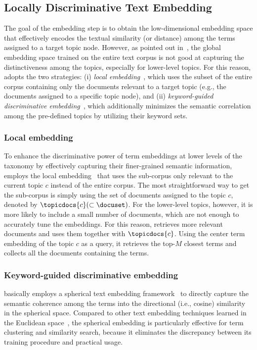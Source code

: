 \subsection{Locally Discriminative Text Embedding}
\label{subsec:embedding}
The goal of the embedding step is to obtain the low-dimensional embedding space that effectively encodes the textual similarity (or distance) among the terms assigned to a target topic node.
However, as pointed out in~\cite{gui2018expert, zhang2018taxogen, shang2020nettaxo}, the global embedding space trained on the entire text corpus is not good at capturing the distinctiveness among the topics, especially for lower-level topics.
For this reason, \proposed adopts the two strategies:
(i) \textit{local embedding}~\cite{gui2018expert}, which uses the subset of the entire corpus containing only the documents relevant to a target topic (e.g., the documents assigned to a specific topic node), and
(ii) \textit{keyword-guided discriminative embedding}~\cite{meng2020discriminative, meng2020hierarchical}, which additionally minimizes the semantic correlation among the pre-defined topics by utilizing their keyword sets.

\subsubsection{Local embedding}
\label{subsubsec:locemb}
To enhance the discriminative power of term embeddings at lower levels of the taxonomy by effectively capturing their finer-grained semantic information, \proposed employs the local embedding~\cite{gui2018expert} that uses the sub-corpus only relevant to the current topic $c$ instead of the entire corpus.
The most straightforward way to get the sub-corpus is simply using the set of documents assigned to the topic $c$, denoted by $\topicdocs{c}(\subset\docuset)$.
For the lower-level topics, however, it is more likely to include a small number of documents, which are not enough to accurately tune the embeddings.
For this reason, \proposed retrieves more relevant documents and uses them together with $\topicdocs{c}$.
Using the center term embedding of the topic $c$ as a query, it retrieves the top-$M$ closest terms and collects all the documents containing the terms.

\subsubsection{Keyword-guided discriminative embedding}
\label{subsubsec:disemb}
\proposed basically employs a spherical text embedding framework~\cite{meng2019spherical} to directly capture the semantic coherence among the terms into the directional (i.e., cosine) similarity in the spherical space.
Compared to other text embedding techniques learned in the Euclidean space~\cite{mikolov2013distributed, bojanowski2017enriching, pennington2014glove}, the spherical embedding is particularly effective for term clustering and similarity search, because it eliminates the discrepancy between its training procedure and practical usage.

